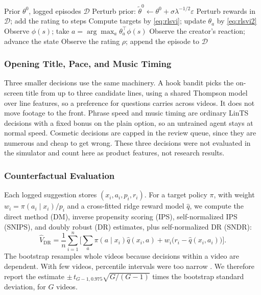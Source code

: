 \documentclass{ieeeaccess}
\begin{document}
\begin{algorithm}[t]
\caption{Visual Rhythm Agent (RLSVI)}
\label{alg:rlsvi}
\begin{algorithmic}[1]
\small
\REQUIRE Prior $\theta^{0}$, logged episodes $\mathcal{D}$
\STATE Perturb prior: $\tilde\theta^{0}\leftarrow\theta^{0}+\sigma\lambda^{-1/2}\varepsilon$
\STATE Perturb rewards in $\mathcal{D}$; add the rating to steps
\STATE Compute targets by \eqref{eq:rlsvi}; update $\theta_a$ by \eqref{eq:rlsvi2}
\ENDFOR
{}
\STATE Observe $\phi(s)$; take $a=\arg\max_a \theta_a^{\top}\phi(s)$
\STATE Observe the creator's reaction; advance the state
\ENDFOR
\STATE Observe the rating $\rho$; append the episode to $\mathcal{D}$
\ENDFOR
\end{algorithmic}
\end{algorithm}

\subsubsection{Opening Title, Pace, and Music Timing}
Three smaller decisions use the same machinery. A hook bandit picks the on-screen title from up to three candidate lines, using a shared Thompson model over line features, so a preference for questions carries across videos. It does not move footage to the front. Phrase speed and music timing are ordinary LinTS decisions with a fixed bonus on the plain option, so an untrained agent stays at normal speed. Cosmetic decisions are capped in the review queue, since they are numerous and cheap to get wrong. These three decisions were not evaluated in the simulator and count here as product features, not research results.

\subsubsection{Counterfactual Evaluation}
Each logged suggestion stores $(x_i,a_i,p_i,r_i)$. For a target policy $\pi$, with weight $w_i=\pi(a_i\mid x_i)/p_i$ and a cross-fitted ridge reward model $\hat q$, we compute the direct method (DM), inverse propensity scoring (IPS), self-normalized IPS (SNIPS), and doubly robust (DR) estimates, plus self-normalized DR (SNDR):
\begin{equation}
\hat V_{\mathrm{DR}} = \frac{1}{n}\sum_{i=1}^{n}\Big[\sum_a \pi(a\mid x_i)\hat q(x_i,a) + w_i\big(r_i-\hat q(x_i,a_i)\big)\Big]. \label{eq:dr}
\end{equation}
The bootstrap resamples whole videos because decisions within a video are dependent. With few videos, percentile intervals were too narrow \cite{cameron2008}. We therefore report the estimate $\pm\, t_{G-1,0.975}\sqrt{G/(G-1)}$ times the bootstrap standard deviation, for $G$ videos.
\end{document}
